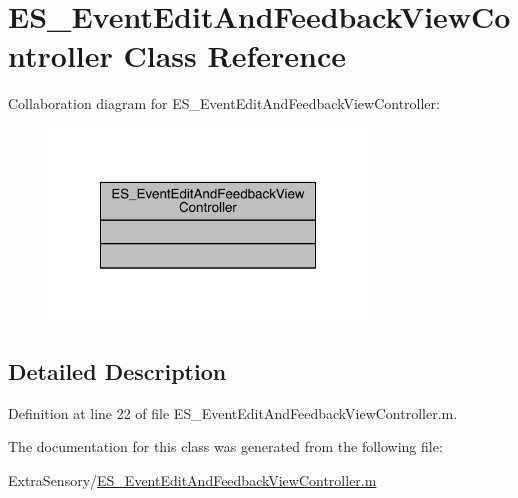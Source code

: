 \hypertarget{class_e_s___event_edit_and_feedback_view_controller}{\section{E\+S\+\_\+\+Event\+Edit\+And\+Feedback\+View\+Controller Class Reference}
\label{class_e_s___event_edit_and_feedback_view_controller}
}


Collaboration diagram for E\+S\+\_\+\+Event\+Edit\+And\+Feedback\+View\+Controller\+:\nopagebreak
\begin{figure}[H]
\begin{center}
\leavevmode
\includegraphics[width=240pt]{d9/d97/class_e_s___event_edit_and_feedback_view_controller__coll__graph}
\end{center}
\end{figure}


\subsection{Detailed Description}


Definition at line 22 of file E\+S\+\_\+\+Event\+Edit\+And\+Feedback\+View\+Controller.\+m.



The documentation for this class was generated from the following file\+:\begin{DoxyCompactItemize}
\item 
Extra\+Sensory/\hyperlink{_e_s___event_edit_and_feedback_view_controller_8m}{E\+S\+\_\+\+Event\+Edit\+And\+Feedback\+View\+Controller.\+m}\end{DoxyCompactItemize}
